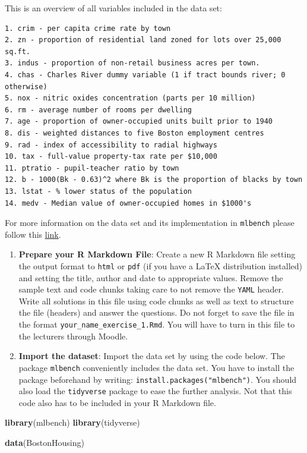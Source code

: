 \documentclass[
]{book}
\newenvironment{Shaded}{\begin{snugshade}}{\end{snugshade}}
\newcommand{\FunctionTok}[1]{\textcolor[rgb]{0.13,0.29,0.53}{\textbf{#1}}}
\newcommand{\NormalTok}[1]{#1}
\begin{document}
This is an overview of all variables included in the data set:

\begin{verbatim}
1. crim - per capita crime rate by town
2. zn - proportion of residential land zoned for lots over 25,000 sq.ft.
3. indus - proportion of non-retail business acres per town.
4. chas - Charles River dummy variable (1 if tract bounds river; 0 otherwise)
5. nox - nitric oxides concentration (parts per 10 million)
6. rm - average number of rooms per dwelling
7. age - proportion of owner-occupied units built prior to 1940
8. dis - weighted distances to five Boston employment centres
9. rad - index of accessibility to radial highways
10. tax - full-value property-tax rate per $10,000
11. ptratio - pupil-teacher ratio by town
12. b - 1000(Bk - 0.63)^2 where Bk is the proportion of blacks by town
13. lstat - % lower status of the population
14. medv - Median value of owner-occupied homes in $1000's
\end{verbatim}

For more information on the data set and its implementation in \texttt{mlbench} please follow this \href{https://search.r-project.org/CRAN/refmans/mlbench/html/BostonHousing.html}{link}.

\begin{enumerate}
\def\labelenumi{\arabic{enumi}.}
\item
  \textbf{Prepare your R Markdown File}: Create a new R Markdown file setting the output format to \texttt{html} or \texttt{pdf} (if you have a LaTeX distribution installed) and setting the title, author and date to appropriate values. Remove the sample text and code chunks taking care to not remove the \texttt{YAML} header. Write all solutions in this file using code chunks as well as text to structure the file (headers) and answer the questions. Do not forget to save the file in the format \texttt{your\_name\_exercise\_1.Rmd}. You will have to turn in this file to the lecturers through Moodle.
\item
  \textbf{Import the dataset}: Import the data set by using the code below. The package \texttt{mlbench} conveniently includes the data set. You have to install the package beforehand by writing: \texttt{install.packages("mlbench")}. You should also load the \texttt{tidyverse} package to ease the further analysis. Not that this code also has to be included in your R Markdown file.
\end{enumerate}

\begin{Shaded}
\begin{Highlighting}[]
\FunctionTok{library}\NormalTok{(mlbench)}
\FunctionTok{library}\NormalTok{(tidyverse)}

\FunctionTok{data}\NormalTok{(BostonHousing)}
\end{Highlighting}
\end{Shaded}
\end{document}
